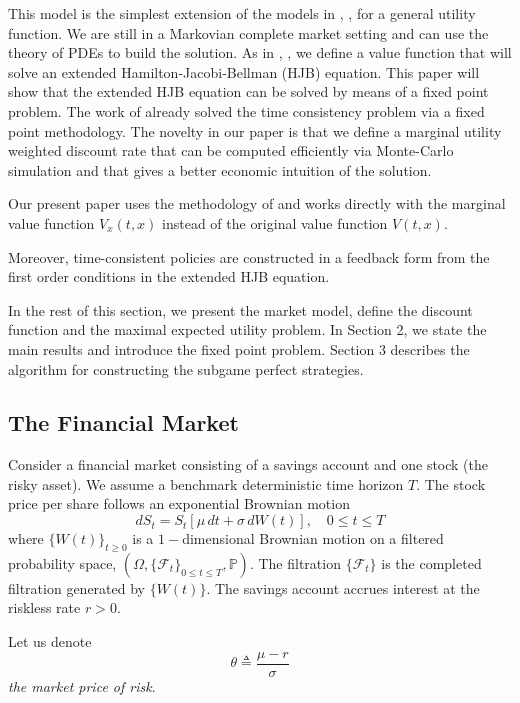 \documentclass[11pt, psfig]{article}
\theoremstyle{definition}
\theoremstyle{remark}
\numberwithin{equation}{section}
\newcommand{\be}{\begin{equation}}
\newcommand{\ee}{\end{equation}}
\begin{document}
This model is the simplest extension of the models in \cite{Ek_Pi1}, \cite{Ek_Mb_Pi1}, \cite{Mb_Pi1}
for a general utility function. We are still in a Markovian complete market setting and can use the theory of PDEs to build the solution. As in \cite{Mb_Pi1}, \cite{Bj_Kh_Mu1}, we define a value function that will solve an extended Hamilton-Jacobi-Bellman (HJB) equation. This paper will show that the extended HJB equation  can be solved by means of a fixed point problem. The work of \cite{Yo1} already solved the time consistency problem via a fixed point methodology. The novelty in our paper is that we define a marginal utility weighted discount rate that can be computed efficiently via Monte-Carlo simulation and that gives a better economic intuition of the solution.

Our present paper uses the methodology of \cite{Na_Za1} and works directly with the marginal value function $V_x(t,x)$ instead of the original value function $V(t,x)$.

Moreover, time-consistent policies are constructed in a feedback form from the first order conditions in the extended HJB equation.

In the rest of this section, we present the market model, define the discount function and the maximal expected utility problem. In Section 2, we state the main results and introduce the fixed point problem. Section 3 describes the algorithm for constructing the subgame perfect strategies.






\subsection{The Financial Market}
Consider a financial market consisting of a savings account and one stock
(the risky asset).  We assume a benchmark deterministic time horizon $T$.
The stock price per share follows an exponential Brownian motion 
\begin{equation}\label{eq121_1}
dS_t=S_t\left[ \mu \,dt+\sigma \,dW(t)\right] ,\quad 0\leq t\leq T
\end{equation}%
where $\{W(t)\}_{t\geq 0}$ is a $1-$dimensional Brownian motion on a
filtered probability space, $(\Omega ,\{\mathcal{F}_{t}\}_{0\leq t\leq T},\mathbb{P}).$  The filtration $\{\mathcal{F}_{t}\}$ is the completed
filtration generated by $\{W(t)\}$. 
The savings account accrues interest at the riskless rate $r>0$.


 Let us denote \be \label{eq121_2}
 \theta \triangleq \frac{\mu
-r}{\sigma}\ee
 \emph{the market price of risk}.
\end{document}
